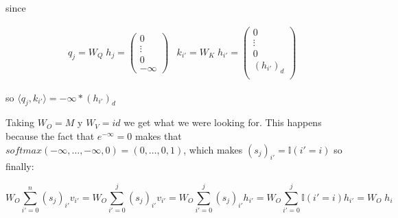 since


\begin{align*}
    &q_{j} = W_Q \; h_j = \left(\begin{matrix}
        0 \\
        \vdots \\
        0 \\
        -\infty
    \end{matrix}\right)
    &k_{i'} = W_K \; h_{i'} = \left(\begin{matrix}
        0 \\
        \vdots \\
        0 \\
        (h_{i'})_{d} \\
    \end{matrix}\right)
\end{align*}

so $\langle q_{j}, k_{i'} \rangle = -\infty *(h_{i'})_{d}$

\bigskip

Taking $W_O = M$ y $W_V = id$ we get what we were looking for. This happens because the fact that $e^{-\infty} = 0$ makes that $softmax(-\infty, \dots, -\infty, 0) = (0, \dots, 0, 1)$, which makes $(s_j)_{i'} = \mathbb{I}(i' = i)$ so finally:

\[
  W_O \sum_{i'=0}^{n} (s_j)_{i'} v_{i'} = 
  W_O \sum_{i'=0}^{j} (s_j)_{i'} v_{i'} = 
  W_O \sum_{i'=0}^{j} (s_j)_{i'} h_{i'} = 
  W_O \sum_{i'=0}^{j} \mathbb{I}(i' = i) h_{i'} = 
  W_O \; h_i
\]
